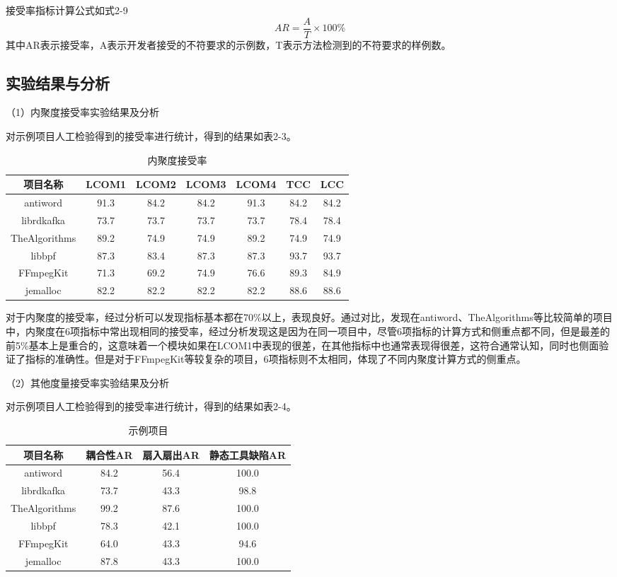 接受率指标计算公式如式2-9
\begin{equation}
{AR} = \frac{A}{T} \times 100\%
\end{equation}
其中AR表示接受率，A表示开发者接受的不符要求的示例数，T表示方法检测到的不符要求的样例数。




\subsection{实验结果与分析}
（1）内聚度接受率实验结果及分析

对示例项目人工检验得到的接受率进行统计，得到的结果如表2-3。

\begin{table}[htbp]
\caption{内聚度接受率}
\vspace{0.5em}\centering\wuhao
\begin{tabular}{ccccccc}
\toprule
项目名称 & LCOM1 & LCOM2 & LCOM3 & LCOM4 & TCC & LCC \\
\midrule
antiword & 91.3 & 84.2 & 84.2 & 91.3 & 84.2 & 84.2 \\
librdkafka & 73.7 & 73.7 & 73.7 & 73.7 & 78.4 & 78.4 \\
TheAlgorithms & 89.2 & 74.9 & 74.9 & 89.2 & 74.9 & 74.9 \\
libbpf & 87.3 & 83.4 & 87.3 & 87.3 & 93.7 &  93.7 \\
FFmpegKit & 71.3 & 69.2 & 74.9 & 76.6 & 89.3 & 84.9 \\
jemalloc & 82.2 & 82.2 & 82.2 & 82.2 & 88.6 & 88.6 \\
\bottomrule
\end{tabular}
\end{table}
对于内聚度的接受率，经过分析可以发现指标基本都在70\%以上，表现良好。通过对比，发现在antiword、TheAlgorithms等比较简单的项目中，内聚度在6项指标中常出现相同的接受率，经过分析发现这是因为在同一项目中，尽管6项指标的计算方式和侧重点都不同，但是最差的前5\%基本上是重合的，这意味着一个模块如果在LCOM1中表现的很差，在其他指标中也通常表现得很差，这符合通常认知，同时也侧面验证了指标的准确性。但是对于FFmpegKit等较复杂的项目，6项指标则不太相同，体现了不同内聚度计算方式的侧重点。

（2）其他度量接受率实验结果及分析

对示例项目人工检验得到的接受率进行统计，得到的结果如表2-4。

\begin{table}[htbp]
\caption{示例项目}
\vspace{0.5em}\centering\wuhao
\begin{tabular}{cccc}
\toprule
项目名称 & 耦合性AR & 扇入扇出AR & 静态工具缺陷AR \\
\midrule
antiword & 84.2 & 56.4 & 100.0 \\
librdkafka & 73.7 & 43.3 & 98.8 \\
TheAlgorithms & 99.2 & 87.6 & 100.0 \\
libbpf & 78.3 & 42.1 & 100.0 \\
FFmpegKit & 64.0 & 43.3 & 94.6 \\
jemalloc & 87.8 & 43.3 & 100.0 \\
\bottomrule
\end{tabular}
\end{table}

